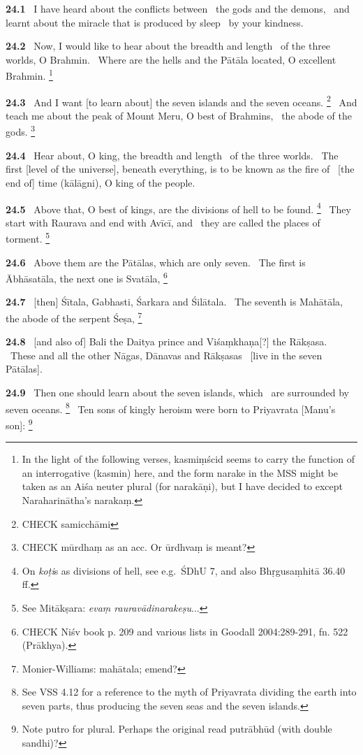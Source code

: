 \documentclass{article}
\newcommand{\skt}[1]{\textit{#1}}
\begin{document}
\textbf{24.1}%
\ I have heard about the conflicts between%
\               the gods and the demons,%
\ and learnt about the miracle that is produced by sleep%
\                         by your kindness.%


\textbf{24.2}%
\ Now, I would like to hear about the breadth and length%
\              of the three worlds, O Brahmin.%
\ Where are the hells and the Pātāla located, O excellent Brahmin.%
\footnote{In the light of the following verses, kasmiṃścid seems to carry         the function of an interrogative (kasmin) here, and the form narake         in the MSS might be taken as an Aiśa neuter plural (for narakāṇi),         but I have decided to except Naraharinātha's narakaṃ. }%


\textbf{24.3}%
\ And I want [to learn about] the seven islands and the seven oceans.%
\footnote{CHECK samicchāmi }%
\ And teach me about the peak of Mount Meru, O best of Brahmins,%
\              the abode of the gods.%
\footnote{CHECK mūrdhaṃ as an acc. Or ūrdhvaṃ is meant? }%


\textbf{24.4}%
\ Hear about, O king, the breadth and length%
\              of the three worlds.%
\ The first [level of the universe], beneath everything, is to be known as the fire of%
\              [the end of] time (kālāgni), O king of the people.%


\textbf{24.5}%
\ Above that, O best of kings, are the divisions of hell to be found.%
\footnote{On \skt{koṭi}s as divisions of hell, see e.g.\ ŚDhU 7, and also Bhṛgusaṃhitā 36.40 ff. }%
\ They start with Raurava and end with Avīcī, and%
\              they are called the places of torment.%
\footnote{See Mitākṣara: \skt{evaṃ rauravādinarakeṣu}... }%


\textbf{24.6}%
\ Above them are the Pātālas, which are only seven.%
\ The first is Ābhāsatāla, the next one is Svatāla,%
\footnote{CHECK Niśv book p. 209 and various lists in Goodall 2004:289-291, fn. 522 (Prākhya). }%


\textbf{24.7}%
\ [then] Śītala, Gabhasti, Śarkara and Śilātala.%
\ The seventh is Mahātāla, the abode of the serpent Śeṣa,%
\footnote{Monier-Williams: mahātala; emend? }%


\textbf{24.8}%
\ [and also of] Bali the Daitya prince and Viśaṃkhaṇa[?] the Rākṣasa.%
\ These and all the other Nāgas, Dānavas and Rākṣasas%
\              [live in the seven Pātālas].%


\textbf{24.9}%
\ Then one should learn about the seven islands, which%
\              are surrounded by seven oceans.%
\footnote{See VSS 4.12 for a reference to the myth of Priyavrata dividing the earth into seven parts,                thus producing the seven seas and the seven islands. }%
\ Ten sons of kingly heroism were born to Priyavrata [Manu's son]:%
\footnote{Note putro for plural. Perhaps the original read putrābhūd (with double sandhi)? }%
\end{document}
